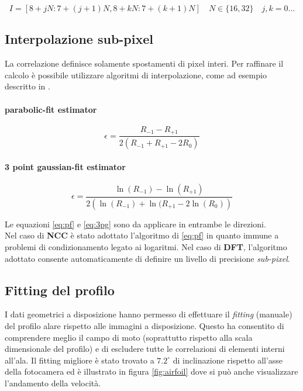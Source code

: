 \documentclass[a4paper]{article}
\begin{document}
\begin{equation}
I = \left[ 8+jN: 7+(j+1)N,8+kN: 7+(k+1)N\right] \quad N \in \{16,32 \} \quad j,k = 0 \ldots
\label{eq:int}
\end{equation}

\subsection{Interpolazione sub-pixel}

La correlazione definisce solamente spostamenti di pixel interi. Per raffinare il calcolo è possibile utilizzare algoritmi di interpolazione, come ad esempio descritto in \cite{spim}.

\paragraph{parabolic-fit estimator}

\begin{equation}
\epsilon =  \frac{R_{-1} - R_{+1} }{2\left( R_{-1} + R_{+1} -2 R_0   \right)}
\label{eq:pf}
\end{equation}



\paragraph{3 point gaussian-fit estimator}

\begin{equation}
\epsilon =  \frac{\ln(R_{-1}) - \ln(R_{+1}) }{2\left( \ln(R_{-1}) + \ln(R_{+1} -2 \ln(R_0)   \right)}
\label{eq:3pg}
\end{equation}

Le equazioni \ref{eq:pf} e \ref{eq:3pg} sono da applicare in entrambe le direzioni.\\
Nel caso di \textbf{NCC} è stato adottato l'algoritmo di \ref{eq:pf} in quanto immune a problemi di condizionamento legato ai logaritmi.
Nel caso di \textbf{DFT}, l'algoritmo adottato \cite{spdft} consente automaticamente di definire un livello di precisione \textit{sub-pixel}. 

\subsection{Fitting del profilo}

I dati geometrici a disposizione hanno permesso di effettuare il \textit{fitting} (manuale) del profilo alare rispetto alle immagini a disposizione. Questo ha consentito di comprendere meglio il campo di moto (soprattutto rispetto alla scala dimensionale del profilo) e di escludere tutte le correlazioni di elementi interni all'ala. Il fitting migliore è stato trovato a $7.2^{\circ}$ di inclinazione rispetto all'asse della fotocamera ed è illustrato in figura \ref{fig:airfoil} dove si può anche visualizzare l'andamento della velocità.  
\end{document}
